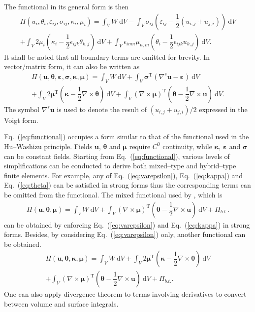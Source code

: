 \documentclass[3p,sort&compress,11pt,fleqn]{elsarticle}
\newcommand*{\eqsref}[1]{Eq.~(\ref{#1})}
\newcommand*{\mT}{\mathrm{T}}
\newcommand*{\md}[1]{\mathrm{d}#1}
\begin{document}
The functional in its general form is then
\begin{multline}
\varPi\left(u_i,\theta_i,\varepsilon_{ij},\sigma_{ij},\kappa_i,\mu_i\right)=\int_VW~\md{V}
-\int_V\sigma_{ij}\left(\varepsilon_{ij}-\dfrac{1}{2}\left(u_{i,j}+u_{j,i}\right)\right)~\md{V}\\
+\int_V2\mu_i\left(\kappa_i-\dfrac{1}{2}\epsilon_{ijk}\theta_{k,j}\right)~\md{V}
+\int_V\epsilon_{imn}\mu_{n,m}\left(\theta_i-\dfrac{1}{2}\epsilon_{ijk}u_{k,j}\right)~\md{V}.
\end{multline}
It shall be noted that all boundary terms are omitted for brevity. In vector/matrix form, it can also be written as
\begin{multline}\label{eq:functional}
\varPi\left(\mathbold{u},\mathbold{\theta},\mathbold{\varepsilon},\mathbold{\sigma},\mathbold{\kappa},\mathbold{\mu}\right)=\int_VW~\md{V}
+\int_V\mathbold{\sigma}^\mT\left(\nabla^s\mathbold{u}-\mathbold{\varepsilon}\right)~\md{V}\\
+\int_V2\mathbold{\mu}^\mT\left(\mathbold{\kappa}-\dfrac{1}{2}\nabla\times\mathbold{\theta}\right)~\md{V}
+\int_V\left(\nabla\times\mathbold{\mu}\right)^\mT\left(\mathbold{\theta}-\dfrac{1}{2}\nabla\times\mathbold{u}\right)~\md{V}.
\end{multline}
The symbol $\nabla^s\mathbold{u}$ is used to denote the result of $\left(u_{i,j}+u_{j,i}\right)/2$ expressed in the Voigt form.

\eqsref{eq:functional} occupies a form similar to that of the functional used in the Hu--Washizu principle. Fields $\mathbold{u}$, $\mathbold{\theta}$ and $\mathbold{\mu}$ require $C^0$ continuity, while $\mathbold{\kappa}$, $\mathbold{\varepsilon}$ and $\mathbold{\sigma}$ can be constant fields. Starting from \eqsref{eq:functional}, various levels of simplifications can be conducted to derive both mixed--type and hybrid--type finite elements. For example, any of \eqsref{eq:varepsilon}, \eqsref{eq:kappa} and \eqsref{eq:theta} can be satisfied in strong forms thus the corresponding terms can be omitted from the functional. The mixed functional used by \citet{Darrall2013}, which is
\begin{gather}
\varPi\left(\mathbold{u},\mathbold{\theta},\mathbold{\mu}\right)=\int_VW~\md{V}
+\int_V\left(\nabla\times\mathbold{\mu}\right)^\mT\left(\mathbold{\theta}-\dfrac{1}{2}\nabla\times\mathbold{u}\right)~\md{V}+\varPi_{b.t.}.
\end{gather}
can be obtained by enforcing \eqsref{eq:varepsilon} and \eqsref{eq:kappa} in strong forms. Besides, by considering \eqsref{eq:varepsilon} only, another functional can be obtained.
\begin{multline}
\varPi\left(\mathbold{u},\mathbold{\theta},\mathbold{\kappa},\mathbold{\mu}\right)=\int_VW~\md{V}
+\int_V2\mathbold{\mu}^\mT\left(\mathbold{\kappa}-\dfrac{1}{2}\nabla\times\mathbold{\theta}\right)~\md{V}\\
+\int_V\left(\nabla\times\mathbold{\mu}\right)^\mT\left(\mathbold{\theta}-\dfrac{1}{2}\nabla\times\mathbold{u}\right)~\md{V}+\varPi_{b.t.}.
\end{multline}
One can also apply divergence theorem to terms involving derivatives to convert between volume and surface integrals.
\end{document}
